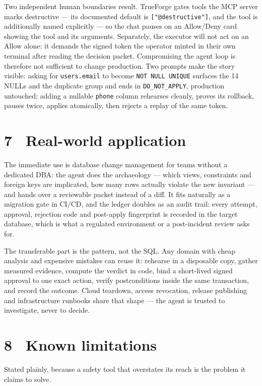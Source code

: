 \documentclass[8pt,a4paper]{extarticle}
\newcommand{\code}[1]{\texttt{\small #1}}
\begin{document}
Two independent human boundaries result. TrueForge gates tools the MCP server marks destructive --- its documented default is \code{["@destructive"]}, and the tool is additionally named explicitly --- so the chat pauses on an Allow/Deny card showing the tool and its arguments. Separately, the executor will not act on an Allow alone: it demands the signed token the operator minted in their own terminal after reading the decision packet. Compromising the agent loop is therefore not sufficient to change production. Two prompts make the story visible: asking for \code{users.email} to become \code{NOT NULL UNIQUE} surfaces the 14 NULLs and the duplicate group and ends in \code{DO\_NOT\_APPLY}, production untouched; adding a nullable \code{phone} column rehearses cleanly, proves its rollback, pauses twice, applies atomically, then rejects a replay of the same token.

\section*{7 \textperiodcentered\ Real-world application}
The immediate use is database change management for teams without a dedicated DBA: the agent does the archaeology --- which views, constraints and foreign keys are implicated, how many rows actually violate the new invariant --- and hands over a reviewable packet instead of a diff. It fits naturally as a migration gate in CI/CD, and the ledger doubles as an audit trail: every attempt, approval, rejection code and post-apply fingerprint is recorded in the target database, which is what a regulated environment or a post-incident review asks for.

The transferable part is the pattern, not the SQL. Any domain with cheap analysis and expensive mistakes can reuse it: rehearse in a disposable copy, gather measured evidence, compute the verdict in code, bind a short-lived signed approval to one exact action, verify postconditions inside the same transaction, and record the outcome. Cloud teardown, access revocation, release publishing and infrastructure runbooks share that shape --- the agent is trusted to investigate, never to decide.

\section*{8 \textperiodcentered\ Known limitations}
Stated plainly, because a safety tool that overstates its reach is the problem it claims to solve.
\end{document}
